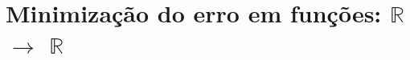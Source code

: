 
\chapter{Minimização do erro em funções: $\mathbb{R}$ $\rightarrow$ $\mathbb{R}$}


\newpage


\newpage


\newpage

